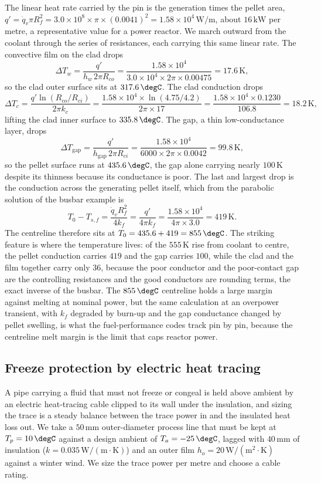The linear heat rate carried by the pin is the generation times the pellet
area, $q' = \dot{q}_v \pi R_f^2 = 3.0\times10^8\times\pi\times(0.0041)^2 =
1.58\times10^4\,\text{W}/\text{m}$, about $16\,\text{kW}$ per metre, a
representative value for a power reactor. We march outward from the coolant
through the series of resistances, each carrying this same linear rate.
The convective film on the clad drops
\[
\Delta T_w = \frac{q'}{h_w\,2\pi R_{co}} = \frac{1.58\times10^4}{3.0\times
10^4\times2\pi\times0.00475} = 17.6\,\si{\kelvin},
\]
so the clad outer surface sits at $317.6\,\degC$. The clad conduction drops
\[
\Delta T_c = \frac{q'\ln(R_{co}/R_{ci})}{2\pi k_c} = \frac{1.58\times10^4
\times\ln(4.75/4.2)}{2\pi\times17} = \frac{1.58\times10^4\times0.1230}{
106.8} = 18.2\,\si{\kelvin},
\]
lifting the clad inner surface to $335.8\,\degC$. The gap, a thin
low-conductance layer, drops
\[
\Delta T_{\text{gap}} = \frac{q'}{h_{\text{gap}}\,2\pi R_{ci}} =
\frac{1.58\times10^4}{6000\times2\pi\times0.0042} = 99.8\,\si{\kelvin},
\]
so the pellet surface runs at $435.6\,\degC$, the gap alone carrying nearly
$100\,\si{\kelvin}$ despite its thinness because its conductance is poor.
The last and largest drop is the conduction across the generating pellet
itself, which from the parabolic solution of the busbar example is
\[
T_0 - T_{s,f} = \frac{\dot{q}_v R_f^2}{4 k_f} = \frac{q'}{4\pi k_f} =
\frac{1.58\times10^4}{4\pi\times3.0} = 419\,\si{\kelvin}.
\]
The centreline therefore sits at $T_0 = 435.6 + 419 = 855\,\degC$. The
striking feature is where the temperature lives: of the $555\,\si{\kelvin}$
rise from coolant to centre, the pellet conduction carries $419$ and the
gap carries $100$, while the clad and the film together carry only $36$,
because the poor conductor and the poor-contact gap are the controlling
resistances and the good conductors are rounding terms, the exact inverse
of the busbar. The $855\,\degC$ centreline holds a large margin against
melting at nominal power, but the same calculation at an overpower
transient, with $k_f$ degraded by burn-up and the gap conductance changed
by pellet swelling, is what the fuel-performance codes track pin by pin,
because the centreline melt margin is the limit that caps reactor power.

\subsection{Freeze protection by electric heat tracing}

A pipe carrying a fluid that must not freeze or congeal is held above
ambient by an electric heat-tracing cable clipped to its wall under the
insulation, and sizing the trace is a steady balance between the trace
power in and the insulated heat loss out. We take a $50\,\si{\milli\meter}$
outer-diameter process line that must be kept at $T_p = 10\,\degC$ against
a design ambient of $T_a = -25\,\degC$, lagged with $40\,\si{\milli\meter}$
of insulation ($k = 0.035\,\text{W}/(\text{m}\cdot\si{\kelvin})$) and an
outer film $h_o = 20\,\text{W}/(\text{m}^2\cdot\si{\kelvin})$ against a
winter wind. We size the trace power per metre and choose a cable rating.

